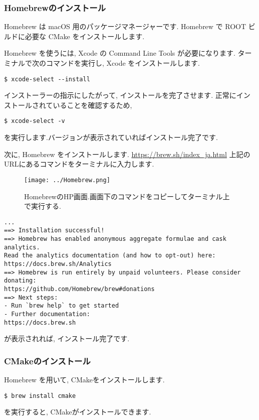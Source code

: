 \subsubsection{Homebrewのインストール}
Homebrew は macOS 用のパッケージマネージャーです.
Homebrew で ROOT ビルドに必要な CMake をインストールします.\par
Homebrew を使うには, Xcode の Command Line Tools が必要になります.
ターミナルで次のコマンドを実行し, Xcode をインストールします.
\begin{lstlisting}
$ xcode-select --install
\end{lstlisting}
インストーラーの指示にしたがって, インストールを完了させます.
正常にインストールされていることを確認するため, 
\begin{lstlisting}
$ xcode-select -v
\end{lstlisting}
を実行します.バージョンが表示されていればインストール完了です.\par
次に, Homebrew をインストールします.
\url{https://brew.sh/index_ja.html}
上記のURLにあるコマンドをターミナルに入力します.
\begin{figure}[H]
    \centering
    \texttt{[image: ../Homebrew.png]}
    \caption{HomebrewのHP画面.画面下のコマンドをコピーしてターミナル上で実行する.}
\end{figure}
\begin{lstlisting}[caption=Homebrewインストール時のスクリプト]
...
==> Installation successful!
==> Homebrew has enabled anonymous aggregate formulae and cask analytics.
Read the analytics documentation (and how to opt-out) here:
https://docs.brew.sh/Analytics
==> Homebrew is run entirely by unpaid volunteers. Please consider donating:
https://github.com/Homebrew/brew#donations
==> Next steps:
- Run `brew help` to get started
- Further documentation:
https://docs.brew.sh
\end{lstlisting}
が表示されれば, インストール完了です.\par

\subsubsection{CMakeのインストール}
Homebrew を用いて, CMakeをインストールします.
\begin{lstlisting}
$ brew install cmake
\end{lstlisting}
を実行すると, CMakeがインストールできます.

